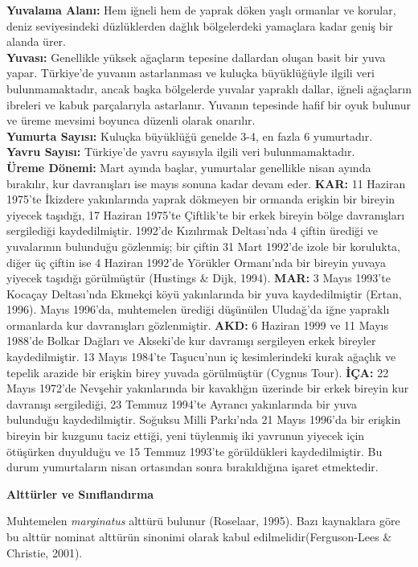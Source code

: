 \documentclass[
  a4paper,
  DIV=11,
  numbers=noendperiod]{scrreprt}
\begin{document}
\textbf{Yuvalama Alanı:} Hem iğneli hem de yaprak döken yaşlı ormanlar
ve korular, deniz seviyesindeki düzlüklerden dağlık bölgelerdeki
yamaçlara kadar geniş bir alanda ürer.\\
\textbf{Yuvası:} Genellikle yüksek ağaçların tepesine dallardan oluşan
basit bir yuva yapar. Türkiye'de yuvanın astarlanması ve kuluçka
büyüklüğüyle ilgili veri bulunmamaktadır, ancak başka bölgelerde yuvalar
yapraklı dallar, iğneli ağaçların ibreleri ve kabuk parçalarıyla
astarlanır. Yuvanın tepesinde hafif bir oyuk bulunur ve üreme mevsimi
boyunca düzenli olarak onarılır.\\
\textbf{Yumurta Sayısı:} Kuluçka büyüklüğü genelde 3-4, en fazla 6
yumurtadır.\\
\textbf{Yavru Sayısı:} Türkiye'de yavru sayısıyla ilgili veri
bulunmamaktadır.\\
\textbf{Üreme Dönemi:} Mart ayında başlar, yumurtalar genellikle nisan
ayında bırakılır, kur davranışları ise mayıs sonuna kadar devam eder.
\textbf{KAR:} 11 Haziran 1975'te İkizdere yakınlarında yaprak dökmeyen
bir ormanda erişkin bir bireyin yiyecek taşıdığı, 17 Haziran 1975'te
Çiftlik'te bir erkek bireyin bölge davranışları sergilediği
kaydedilmiştir. 1992'de Kızılırmak Deltası'nda 4 çiftin ürediği ve
yuvalarının bulunduğu gözlenmiş; bir çiftin 31 Mart 1992'de izole bir
korulukta, diğer üç çiftin ise 4 Haziran 1992'de Yörükler Ormanı'nda bir
bireyin yuvaya yiyecek taşıdığı görülmüştür (Hustings \& Dijk, 1994).
\textbf{MAR:} 3 Mayıs 1993'te Kocaçay Deltası'nda Ekmekçi köyü
yakınlarında bir yuva kaydedilmiştir (Ertan, 1996). Mayıs 1996'da,
muhtemelen ürediği düşünülen Uludağ'da iğne yapraklı ormanlarda kur
davranışları gözlenmiştir. \textbf{AKD:} 6 Haziran 1999 ve 11 Mayıs
1988'de Bolkar Dağları ve Akseki'de kur davranışı sergileyen erkek
bireyler kaydedilmiştir. 13 Mayıs 1984'te Taşucu'nun iç kesimlerindeki
kurak ağaçlık ve tepelik arazide bir erişkin birey yuvada görülmüştür
(Cygnus Tour). \textbf{İÇA:} 22 Mayıs 1972'de Nevşehir yakınlarında bir
kavaklığın üzerinde bir erkek bireyin kur davranışı sergilediği, 23
Temmuz 1994'te Ayrancı yakınlarında bir yuva bulunduğu kaydedilmiştir.
Soğuksu Milli Parkı'nda 21 Mayıs 1996'da bir erişkin bireyin bir kuzgunu
taciz ettiği, yeni tüylenmiş iki yavrunun yiyecek için ötüşürken
duyulduğu ve 15 Temmuz 1993'te görüldükleri kaydedilmiştir. Bu durum
yumurtaların nisan ortasından sonra bırakıldığına işaret etmektedir.

\textbf{Alttürler ve Sınıflandırma}

Muhtemelen \emph{marginatus} alttürü bulunur (Roselaar, 1995). Bazı
kaynaklara göre bu alttür nominat alttürün sinonimi olarak kabul
edilmelidir(Ferguson-Lees \& Christie, 2001).
\end{document}
